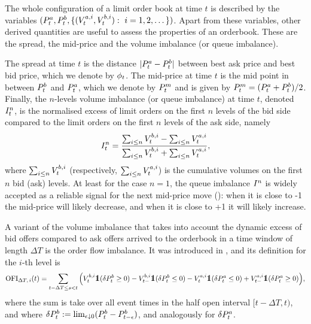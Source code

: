 \documentclass[10pt, article,table]{article}
\begin{document}
The whole configuration of a limit order book at time $t$ is described by the variables $(\bestAskPrice_t, \bestBidPrice_t, \lbrace (\nthBestAskVolume[i]_t, \nthBestBidVolume[i]_t) : \, \, i=1,2,\dots\rbrace)$. Apart from these variables, other derived quantities are useful to assess the properties of an orderbook. These are the spread, the mid-price and the volume imbalance (or queue imbalance). 

The spread at time $t$ is the distance $\lvert \bestAskPrice_t - \bestBidPrice_t \rvert$ between best ask price  and best bid price, which we denote by $\LOBspread_t$.  The mid-price at time $t$ is the mid point in between  $\bestBidPrice_t$ and $\bestAskPrice_{t}$, which we denote by $\price^{m}_t$ and is given by $\price^m_t = (\bestAskPrice_t + \bestBidPrice_{t})/{2}$.
Finally, the $n$-levels volume imbalance (or queue imbalance) at time $t$, denoted $\volumeImbalance^{n}_t$, is the normalised excess of limit orders on the first $n$ levels of the bid side compared to the limit orders on the first $n$ levels of the ask side, namely
\begin{equation}\label{eq.definition_volume_imbalance}
\volumeImbalance^{n}_t =
\frac{\sum_{i\leq n}\nthBestBidVolume[i]_t - \sum_{i\leq n}\nthBestAskVolume[i]_t}{\sum_{i\leq n}\nthBestBidVolume[i]_t + \sum_{i\leq n}\nthBestAskVolume[i]_t},
\end{equation}
where $\sum_{i\leq n}\nthBestBidVolume[i]_t$ (respectively, $\sum_{i\leq n}\nthBestAskVolume[i]_t$) is the cumulative volumes on the first $n$ bid (ask) levels. 
At least for the case $n=1$, the queue imbalance $\volumeImbalance^n$ is widely accepted as a reliable signal for the next mid-price move (\citealp{CDJ18enh}): when it is close to -1 the mid-price will likely decrease, and when it is close to +1 it will likely increase. 

A variant of the volume imbalance that takes into account the dynamic excess of bid offers compared to ask offers arrived to the orderbook in a time window of length $\Delta T$ is the order flow imbalance. It was introduced in \citealp{CKS14pri}, and its definition for the $i$-th level is
\begin{equation*}
\orderFlowImbalance_{\Delta T, \, i}(t)
=
\sum_{t-\Delta T \leq s < t} 
\Big(
\nthBestBidVolume[i]_t \one (\delta\bestBidPrice_t \geq 0)
- \nthBestBidVolume[i]_{t-} \one (\delta\bestBidPrice_t \leq 0)
- \nthBestAskVolume[i]_t \one (\delta\bestAskPrice_t \leq 0)
+ \nthBestAskVolume[i]_{t-} \one (\delta\bestAskPrice_t \geq 0)
\Big),
\end{equation*}
where the sum is take over all event times in the half open interval $[t-\Delta T, t)$, and where $\delta\bestBidPrice_t : = \lim_{\epsilon\downarrow 0} (\bestBidPrice_t - \bestBidPrice_{t-\epsilon} )$, and analogously for $\delta\bestAskPrice_t$. 
\end{document}
